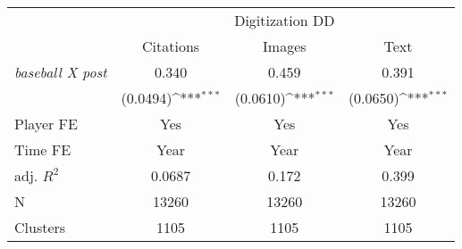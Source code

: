 {
\def\sym#1{\ifmmode^{#1}\else\(^{#1}\)\fi}
\begin{tabular*}{\hsize}{@{\hskip\tabcolsep\extracolsep\fill}l*{3}{c}}
\toprule
            &\multicolumn{3}{c}{Digitization DD}                              \\\cmidrule(lr){2-4}
            &\multicolumn{1}{c}{Citations}&\multicolumn{1}{c}{Images}&\multicolumn{1}{c}{Text}\\
\midrule
\emph{baseball X post}&       0.340         &       0.459         &       0.391         \\
            &    (0.0494)\sym{***}&    (0.0610)\sym{***}&    (0.0650)\sym{***}\\
\midrule
Player FE   &         Yes         &         Yes         &         Yes         \\
Time FE     &        Year         &        Year         &        Year         \\
adj. $R^2$  &      0.0687         &       0.172         &       0.399         \\
N           &       13260         &       13260         &       13260         \\
Clusters    &        1105         &        1105         &        1105         \\
\bottomrule
\end{tabular*}
}
